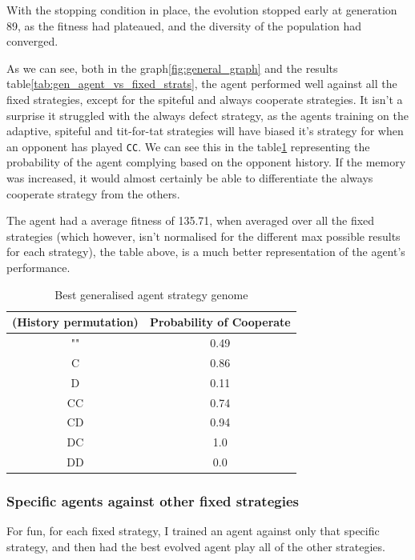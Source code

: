 \documentclass[11pt]{scrartcl} %
\begin{document}
With the stopping condition in place, the evolution stopped early at generation 89, as the fitness had plateaued, and the diversity of the population had converged.

As we can see, both in the graph\ref{fig:general_graph} and the results table\ref{tab:gen_agent_vs_fixed_strats}, 
the agent performed well against all the fixed strategies, except for the spiteful and always cooperate strategies.
It isn't a surprise it struggled with the always defect strategy, as the agents training on the adaptive, spiteful and tit-for-tat strategies will have biased it's strategy for when an opponent has played \texttt{CC}. 
We can see this in the table\ref{tab:history_probabilities} representing the probability of the agent complying based on the opponent history.
If the memory was increased, it would almost certainly be able to differentiate the always cooperate strategy from the others.

The agent had a average fitness of 135.71, when averaged over all the fixed strategies 
(which however, isn't normalised for the different max possible results for each strategy), the table above, is a much better representation of the agent's performance.

\begin{table}[h!]
	\centering
	\begin{tabular}{|c|c|}
		\hline
		\textbf{(History permutation)} & \textbf{Probability of Cooperate} \\ \hline
		"" & 0.49 \\ \hline
		C & 0.86 \\ \hline
		D & 0.11 \\ \hline
		CC & 0.74 \\ \hline
		CD & 0.94 \\ \hline
		DC & 1.0 \\ \hline
		DD & 0.0 \\ \hline
	\end{tabular}
	\caption{Best generalised agent strategy genome}
	\label{tab:history_probabilities}
\end{table}

\subsubsection{Specific agents against other fixed strategies}

For fun, for each fixed strategy, I trained an agent against only that specific strategy, and then had the best evolved agent play all of the other strategies.
\end{document}
